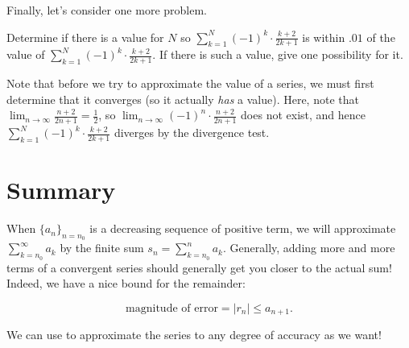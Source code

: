 \documentclass{ximera}
\begin{document}
Finally, let's consider one more problem.
\begin{question}
Determine if there is a value for $N$ so $\sum_{k=1}^{N} (-1)^k \cdot \frac{k+2}{2k+1}$ is within $.01$ of the value of $\sum_{k=1}^{N} (-1)^k \cdot \frac{k+2}{2k+1}$.  If there is such a value, give one possibility for it.

\begin{multipleChoice}
\end{multipleChoice}

\begin{feedback}
Note that before we try to approximate the value of a series, we must first determine that it converges (so it actually \emph{has} a value).  Here, note that $\lim_{n \to \infty} \frac{n+2}{2n+1} = \frac{1}{2}$, so $\lim_{n \to \infty} (-1)^n \cdot \frac{n+2}{2n+1}$ does not exist, and hence $\sum_{k=1}^{N} (-1)^k \cdot \frac{k+2}{2k+1}$ diverges by the divergence test.
\end{feedback}
\end{question}

\section{Summary}

When $\{a_n\}_{n = n_0}$ is a decreasing sequence of positive term, we will approximate $\sum_{k=n_0}^{\infty} a_k$ by the finite sum $s_n =\sum_{k=n_0}^{n} a_k$.  Generally, adding more and more terms of a convergent series should generally get you closer to the actual sum!
Indeed, we have a nice bound for the remainder:

\[ \textrm{magnitude of error} = |r_n| \leq a_{n+1}.\]  

We can use to approximate the series to any degree of accuracy as we want!
\end{document}
